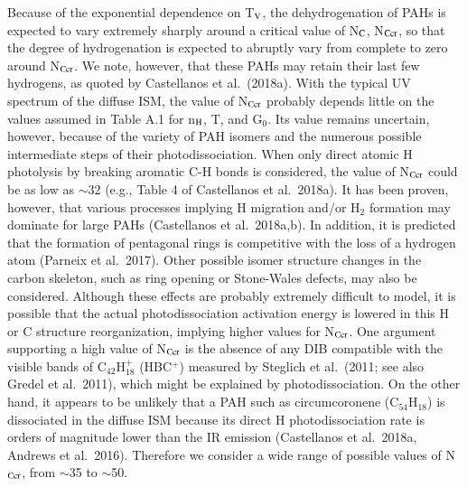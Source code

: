 \documentclass{aa}
\begin{document}
Because of the exponential dependence on T$_{\rm V}$, the dehydrogenation 
of PAHs is expected to vary extremely sharply  around a critical value of N$_{\rm 
C}$,  N$_{\rm Ccr}$, so that the degree of hydrogenation is expected to abruptly vary from complete to zero around N$_{\rm Ccr}$. 
We note, however, that these PAHs may  retain their last few hydrogens, as quoted by Castellanos et al.\ (2018a). 
With the typical UV spectrum of the diffuse ISM, the value of N$_{\rm Ccr}$ probably depends little on the values assumed in Table A.1 for n$_{\rm H}$, T, and G$_0$. 
Its value remains uncertain, however, because of the variety of PAH isomers and 
the numerous possible intermediate steps of their photodissociation. When only direct atomic H photolysis by breaking aromatic C-H bonds is considered, the value of N$_{\rm Ccr}$ could be as low as $\sim$32 (e.g., Table 4 
of  Castellanos et al.\ 2018a). It has been proven, however, that various processes implying H migration and/or H$_2$ formation may dominate for large PAHs (Castellanos et al.\ 2018a,b). In addition, it is predicted  that the formation of pentagonal rings is competitive with the loss of a hydrogen atom (Parneix et al.\ 2017). Other possible isomer structure changes in the carbon skeleton, such as ring opening or Stone-Wales defects, may also be considered. Although these effects are probably extremely difficult to model, it is possible that the actual photodissociation activation energy is lowered in this H or C structure reorganization, implying higher values for N$_{\rm Ccr}$. 
One argument supporting a high value of N$_{\rm Ccr}$ is the absence of any DIB compatible with the visible bands of C$_{42}$H$_{18}^+$ (HBC$^+$) measured by Steglich et al.\ (2011; see also Gredel et al.\ 2011), which might be explained by photodissociation. On the other hand, it appears to be unlikely that a PAH such as circumcoronene (C$_{54}$H$_{18}$) is dissociated in the diffuse ISM because its direct H  photodissociation rate is orders of magnitude lower than the IR emission (Castellanos et al.\ 2018a, Andrews et al.\ 2016). Therefore we consider a wide range of possible 
values of N$_{\rm Ccr}$, from $\sim$35 to $\sim$50.
\end{document}
